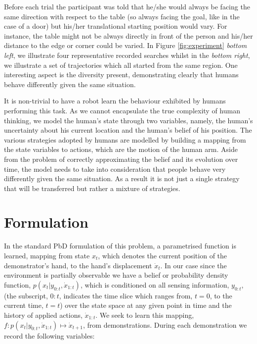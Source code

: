 Before each trial the participant was told that he/she would always be facing the same direction with respect to the table (so always facing the goal, 
like in the case of a door) but his/her translational starting position would vary. 
For instance, the table might not be always directly in front of the person and his/her distance to the edge or 
corner could be varied. In Figure \ref{fig:experiment}
\textit{bottom left}, we illustrate four representative recorded searches whilst in the \textit{bottom right}, we illustrate a set of trajectories 
which all started from the same region. One interesting aspect is the diversity present,
demonstrating clearly that humans behave differently given the same situation.  

It is non-trivial to have a robot learn the behaviour exhibited by humans performing this task. As we cannot encapsulate the true complexity of 
human thinking, we model the human's state through two variables, namely, the human's uncertainty about his current location and the human's  
belief of his position. The various strategies adopted by humans are modelled by building a mapping from the state variables to actions, which are the motion of 
the human arm. Aside from the problem of correctly approximating the belief and its evolution over time, the model needs to take into consideration
that people behave very differently given the same situation. As a result it is not just a single strategy that will be transferred but rather a mixture 
of strategies. 


\section{Formulation} \label{ch3:formulation}

In the standard PbD formulation of this problem, a parametrised function is learned,
mapping from state $x_t$, which denotes the current position of the demonstrator's hand, to  
the hand's displacement $\dot{x}_t$. In our case since the environment is partially observable 
we have a belief or probability density function, $p(x_{t}|y_{0:t},\dot{x}_{1:t})$, which is conditioned on all 
sensing information, $y_{0:t}$, (the subscript, $0:t$, indicates the time slice which ranges from, $t=0$, to 
the current time, $t=t$) over the state space at any given point in time and the history of applied actions, $\dot{x}_{1:t}$. 
We seek to learn this mapping, ${f : p(x_{t}|y_{0:t},\dot{x}_{1:t}) \mapsto \dot{x}_{t+1}}$, from demonstrations. During 
each demonstration we record the following variables:

